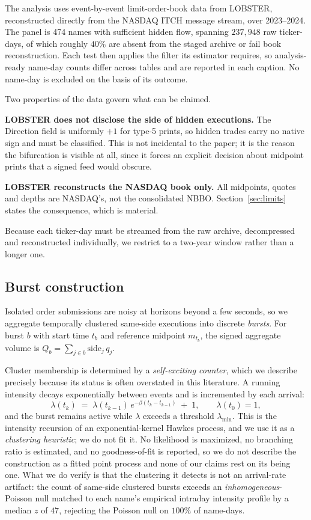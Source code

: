 \documentclass[11pt]{article}
\begin{document}
The analysis uses event-by-event limit-order-book data from LOBSTER, reconstructed directly
from the NASDAQ ITCH message stream, over 2023--2024. The panel is 474 names with
sufficient hidden flow, spanning $237{,}948$ raw ticker-days, of which roughly $40\%$ are
absent from the staged archive or fail book reconstruction. Each test then applies the
filter its estimator requires, so analysis-ready name-day counts differ across tables and
are reported in each caption. No name-day is excluded on the basis of its outcome.

Two properties of the data govern what can be claimed.

\textbf{LOBSTER does not disclose the side of hidden executions.} The Direction field is
uniformly $+1$ for type-5 prints, so hidden trades carry no native sign and must be
classified. This is not incidental to the paper; it is the reason the bifurcation is
visible at all, since it forces an explicit decision about midpoint prints that a signed
feed would obscure.

\textbf{LOBSTER reconstructs the NASDAQ book only.} All midpoints, quotes and depths are
NASDAQ's, not the consolidated NBBO. Section~\ref{sec:limits} states the consequence, which
is material.

Because each ticker-day must be streamed from the raw archive, decompressed and
reconstructed individually, we restrict to a two-year window rather than a longer one.

\subsection{Burst construction}
\label{sec:burstdef}

Isolated order submissions are noisy at horizons beyond a few seconds, so we aggregate
temporally clustered same-side executions into discrete \emph{bursts}. For burst $b$ with
start time $t_b$ and reference midpoint $m_{t_b}$, the signed aggregate volume is
$Q_b = \sum_{j \in b} \text{side}_j\, q_j$.

Cluster membership is determined by a \emph{self-exciting counter}, which we describe
precisely because its status is often overstated in this literature. A running intensity
decays exponentially between events and is incremented by each arrival:
\begin{equation}
\lambda(t_k) \;=\; \lambda(t_{k-1})\, e^{-\beta (t_k - t_{k-1})} \;+\; 1,
\qquad \lambda(t_0) = 1,
\label{eq:counter}
\end{equation}
and the burst remains active while $\lambda$ exceeds a threshold $\lambda_{\min}$. This is
the intensity recursion of an exponential-kernel Hawkes process, and we use it as a
\emph{clustering heuristic}; we do not fit it. No likelihood is maximized, no branching
ratio is estimated, and no goodness-of-fit is reported, so we do not describe the
construction as a fitted point process and none of our claims rest on its being one. What
we do verify is that the clustering it detects is not an arrival-rate artifact: the count
of same-side clustered bursts exceeds an \emph{inhomogeneous}-Poisson null matched to each
name's empirical intraday intensity profile by a median $z$ of $47$, rejecting the Poisson
null on $100\%$ of name-days.
\end{document}
